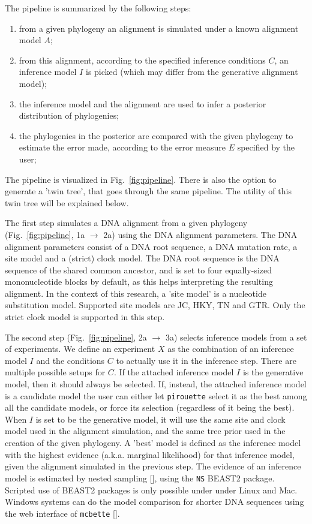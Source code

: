 \documentclass{article}
\begin{document}
The pipeline is summarized by the following steps:
\begin{enumerate}
  \item from a given phylogeny an alignment is simulated 
    under a known alignment model $\mathit{A}$;
  \item from this alignment, according to the specified inference conditions $\mathit{C}$, 
    an inference model $\mathit{I}$ is picked (which may differ from the 
    generative alignment model);
  \item the inference model and the alignment are used 
    to infer a posterior distribution of phylogenies;
  \item the phylogenies in the posterior are compared with the given phylogeny 
    to estimate the error made, according to the error measure $\mathit{E}$ specified 
    by the user;
\end{enumerate}
The pipeline is visualized in Fig.~\ref{fig:pipeline}. 
There is also the option to generate a 'twin tree', 
that goes through the same pipeline. 
The utility of this twin tree will be explained below.

The first step simulates a DNA alignment from a given 
phylogeny (Fig.~\ref{fig:pipeline}, 1a $\rightarrow$ 2a)
using the DNA alignment parameters.
The DNA alignment parameters consist of a DNA root sequence, a DNA mutation rate,
a site model and a (strict) clock model.
The DNA root sequence is the DNA sequence of the shared common ancestor,
and is set to four equally-sized mononucleotide blocks by default, as this
helps interpreting the resulting alignment.
In the context of this research, a 'site model' is a nucleotide substitution
model. Supported site models are JC, HKY, TN and GTR. Only the strict
clock model is supported in this step.

The second step (Fig.~\ref{fig:pipeline}, 2a $\rightarrow$ 3a)
selects inference models from a set of experiments. 
We define an experiment $X$ as the combination of an inference model $I$
and the conditions $C$ to actually use it in the inference step.
There are multiple possible setups for $C$. 
If the attached inference model $I$ is the generative model, then it should always be selected. If, instead, the attached inference model is a candidate model the user can either let \verb;pirouette; select it as the best among all the candidate models, or force its selection (regardless
of it being the best).
When $I$ is set to be the generative model,
it will use the 
same site and clock model used in the alignment simulation,
and the same tree prior used in the creation of the given phylogeny. 
A 'best' model is defined as the inference model with
the highest evidence (a.k.a. marginal likelihood) for that inference model, 
given the alignment simulated in the previous step.
The evidence of an inference model is estimated by nested 
sampling [\cite{maturana2018model}], using the \verb;NS; BEAST2 package.
Scripted use of BEAST2 packages is only possible under under Linux and Mac.
Windows systems can do the model comparison for shorter DNA sequences
using the web interface of \verb;mcbette; [\cite{mcbette}].
\end{document}
